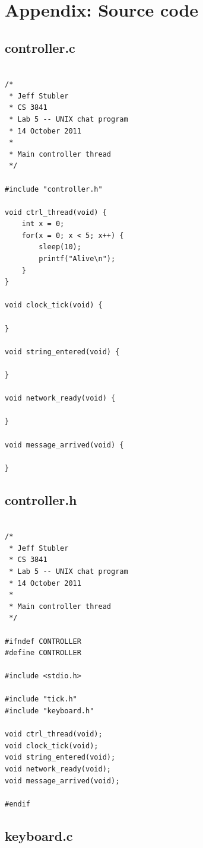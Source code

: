 \documentclass{article}
\begin{document}
\section*{Appendix: Source code}

\subsection*{controller.c}

\begin{verbatim}

/*
 * Jeff Stubler
 * CS 3841
 * Lab 5 -- UNIX chat program
 * 14 October 2011
 *
 * Main controller thread
 */

#include "controller.h"

void ctrl_thread(void) {
    int x = 0;
    for(x = 0; x < 5; x++) {
        sleep(10);
        printf("Alive\n");
    }
}

void clock_tick(void) {
    
}

void string_entered(void) {
    
}

void network_ready(void) {
    
}

void message_arrived(void) {
    
}

\end{verbatim}

\subsection*{controller.h}

\begin{verbatim}

/*
 * Jeff Stubler
 * CS 3841
 * Lab 5 -- UNIX chat program
 * 14 October 2011
 *
 * Main controller thread
 */

#ifndef CONTROLLER
#define CONTROLLER

#include <stdio.h>

#include "tick.h"
#include "keyboard.h"

void ctrl_thread(void);
void clock_tick(void);
void string_entered(void);
void network_ready(void);
void message_arrived(void);

#endif

\end{verbatim}

\subsection*{keyboard.c}
\end{document}
